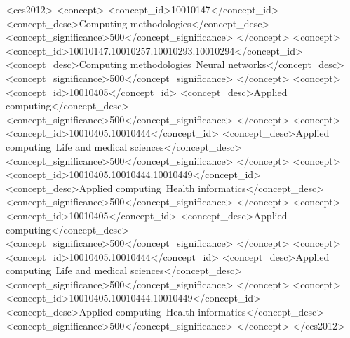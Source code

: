\documentclass[sigconf,screen]{acmart}
\begin{document}
\begin{CCSXML}
<ccs2012>
   <concept>
       <concept_id>10010147</concept_id>
       <concept_desc>Computing methodologies</concept_desc>
       <concept_significance>500</concept_significance>
       </concept>
   <concept>
       <concept_id>10010147.10010257.10010293.10010294</concept_id>
       <concept_desc>Computing methodologies~Neural networks</concept_desc>
       <concept_significance>500</concept_significance>
       </concept>
   <concept>
       <concept_id>10010405</concept_id>
       <concept_desc>Applied computing</concept_desc>
       <concept_significance>500</concept_significance>
       </concept>
   <concept>
       <concept_id>10010405.10010444</concept_id>
       <concept_desc>Applied computing~Life and medical sciences</concept_desc>
       <concept_significance>500</concept_significance>
       </concept>
   <concept>
       <concept_id>10010405.10010444.10010449</concept_id>
       <concept_desc>Applied computing~Health informatics</concept_desc>
       <concept_significance>500</concept_significance>
       </concept>
   <concept>
       <concept_id>10010405</concept_id>
       <concept_desc>Applied computing</concept_desc>
       <concept_significance>500</concept_significance>
       </concept>
   <concept>
       <concept_id>10010405.10010444</concept_id>
       <concept_desc>Applied computing~Life and medical sciences</concept_desc>
       <concept_significance>500</concept_significance>
       </concept>
   <concept>
       <concept_id>10010405.10010444.10010449</concept_id>
       <concept_desc>Applied computing~Health informatics</concept_desc>
       <concept_significance>500</concept_significance>
       </concept>
 </ccs2012>
\end{CCSXML}





\end{document}

